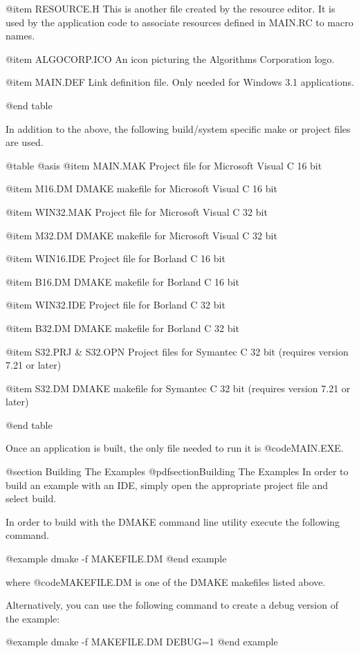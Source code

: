 @item RESOURCE.H
This is another file created by the resource editor.  It is used by the
application code to associate resources defined in MAIN.RC to macro names.

@item ALGOCORP.ICO
An icon picturing the Algorithms Corporation logo.

@item MAIN.DEF
Link definition file.  Only needed for Windows 3.1 applications.

@end table


In addition to the above, the following build/system specific make or
project files are used.

@table @asis
@item MAIN.MAK
Project file for Microsoft Visual C 16 bit

@item M16.DM
DMAKE makefile for Microsoft Visual C 16 bit

@item WIN32.MAK
Project file for Microsoft Visual C 32 bit

@item M32.DM
DMAKE makefile for Microsoft Visual C 32 bit

@item WIN16.IDE
Project file for Borland C 16 bit

@item B16.DM
DMAKE makefile for Borland C 16 bit

@item WIN32.IDE
Project file for Borland C 32 bit

@item B32.DM
DMAKE makefile for Borland C 32 bit

@item S32.PRJ & S32.OPN
Project files for Symantec C 32 bit
(requires version 7.21 or later)

@item S32.DM
DMAKE makefile for Symantec C 32 bit
(requires version 7.21 or later)

@end table


Once an application is built, the only file needed to run it is
@code{MAIN.EXE}.



@section Building The Examples
@pdfsection{Building The Examples}
In order to build an example with an IDE, simply open the appropriate
project file and select build.

In order to build with the DMAKE command line utility execute the
following command.

@example
dmake -f MAKEFILE.DM
@end example

where @code{MAKEFILE.DM} is one of the DMAKE makefiles listed above.

Alternatively, you can use the following command to create a debug
version of the example:

@example
dmake -f MAKEFILE.DM  DEBUG=1
@end example



